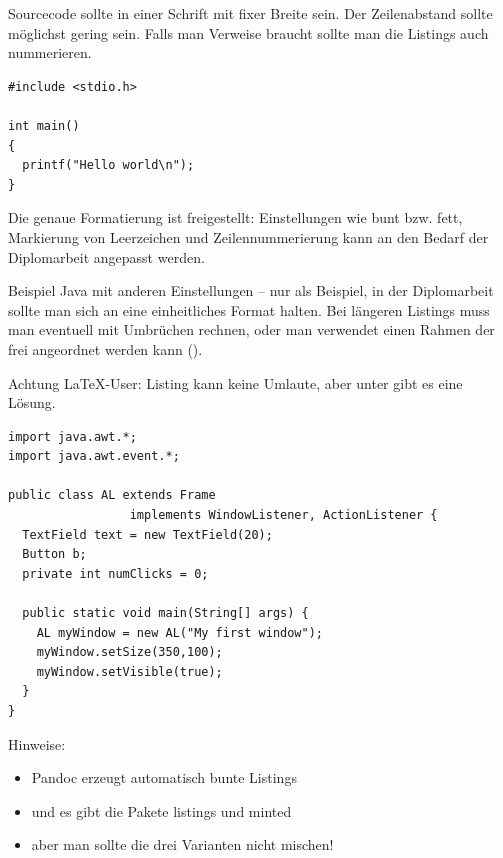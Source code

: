 Sourcecode sollte in einer Schrift mit fixer Breite sein. Der Zeilenabstand sollte möglichst gering sein.
Falls man Verweise braucht sollte man die Listings auch nummerieren. 

\lstset{numbers=left, numberstyle=\tiny, stepnumber=2, numbersep=5pt, showspaces=true, frame=single}
\lstset{language=C}

\begin{lstlisting} 
#include <stdio.h>

int main() 
{ 
  printf("Hello world\n"); 
} 
\end{lstlisting} 

Die genaue Formatierung ist freigestellt: Einstellungen wie bunt bzw.
fett, Markierung von Leerzeichen und Zeilennummerierung kann an den
Bedarf der Diplomarbeit angepasst werden. 

Beispiel Java mit anderen Einstellungen -- nur als Beispiel, in der
Diplomarbeit sollte man sich an eine einheitliches Format halten.
Bei längeren Listings muss man eventuell mit Umbrüchen rechnen, oder
man verwendet einen Rahmen der frei angeordnet werden kann ().

\lstset{numbers=right, numberstyle=\tiny, stepnumber=2, numbersep=5pt, showspaces=false, frame=single}
\lstset{language=Java}

Achtung \LaTeX{}-User: Listing kann keine Umlaute, aber unter \citep{listingtipp}
gibt es eine Lösung.

\begin{lstlisting}[caption={Java Beispiel},captionpos=b]
import java.awt.*;  
import java.awt.event.*;

public class AL extends Frame
                 implements WindowListener, ActionListener {
  TextField text = new TextField(20);
  Button b;    
  private int numClicks = 0;
 
  public static void main(String[] args) {
    AL myWindow = new AL("My first window");
    myWindow.setSize(350,100);
    myWindow.setVisible(true);    
  } 
}
\end{lstlisting}

\needspace{2cm}
Hinweise: 
\begin{itemize}
\item Pandoc erzeugt automatisch bunte Listings
\item und es gibt die Pakete listings und minted 
\item aber man sollte die drei Varianten nicht mischen!
\end{itemize}


